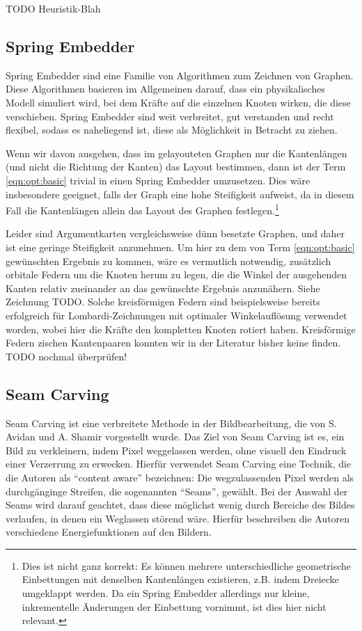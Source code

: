 TODO Heuristik-Blah

\subsection{Spring Embedder}

Spring Embedder sind eine Familie von Algorithmen zum Zeichnen von Graphen. Diese Algorithmen basieren im Allgemeinen darauf, dass ein physikalisches Modell simuliert wird, bei dem Kräfte auf die einzelnen Knoten wirken, die diese verschieben. Spring Embedder sind weit verbreitet, gut verstanden und recht flexibel\cite{kobourov2012spring}, sodass es naheliegend ist, diese als Möglichkeit in Betracht zu ziehen.

Wenn wir davon ausgehen, dass im gelayouteten Graphen nur die Kantenlängen (und nicht die Richtung der Kanten) das Layout bestimmen, dann ist der Term \ref{eqn:opt:basic} trivial in einen Spring Embedder umzusetzen. Dies wäre insbesondere geeignet, falls der Graph eine hohe Steifigkeit aufweist, da in diesem Fall die Kantenlängen allein das Layout des Graphen festlegen.\footnote{Dies ist nicht ganz korrekt: Es können mehrere unterschiedliche geometrische Einbettungen mit denselben Kantenlängen existieren, z.B. indem Dreiecke umgeklappt werden. Da ein Spring Embedder allerdings nur kleine, inkrementelle Änderungen der Einbettung vornimmt, ist dies hier nicht relevant.}

Leider sind Argumentkarten vergleichsweise dünn besetzte Graphen, und daher ist eine geringe Steifigkeit anzunehmen. Um hier zu dem von Term \ref{eqn:opt:basic} gewünschten Ergebnis zu kommen, wäre es vermutlich notwendig, zusätzlich orbitale Federn um die Knoten herum zu legen, die die Winkel der ausgehenden Kanten relativ zueinander an das gewünschte Ergebnis anzunähern. Siehe Zeichnung TODO. Solche kreisförmigen Federn sind beispielsweise bereits erfolgreich für Lombardi-Zeichnungen mit optimaler Winkelauflösung verwendet worden\cite{chernobelskiy2012force}, wobei hier die Kräfte den kompletten Knoten rotiert haben. Kreisförmige Federn zischen Kantenpaaren konnten wir in der Literatur bisher keine finden. TODO nochmal überprüfen!

\subsection{Seam Carving}

Seam Carving ist eine verbreitete Methode in der Bildbearbeitung, die von S. Avidan und A. Shamir vorgestellt wurde.\cite{avidan2007seam} Das Ziel von Seam Carving ist es, ein Bild zu verkleinern, indem Pixel weggelassen werden, ohne visuell den Eindruck einer Verzerrung zu erwecken. Hierfür verwendet Seam Carving eine Technik, die die Autoren als "`content aware"' bezeichnen: Die wegzulassenden Pixel werden als durchgänginge Streifen, die sogenannten "`Seams"', gewählt. Bei der Auswahl der Seams wird darauf geachtet, dass diese möglichst wenig durch Bereiche des Bildes verlaufen, in denen ein Weglassen störend wäre. Hierfür beschreiben die Autoren verschiedene Energiefunktionen auf den Bildern.

